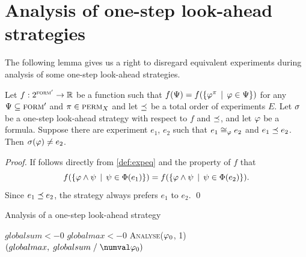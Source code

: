 \section{Analysis of one-step look-ahead strategies}

The following lemma gives us a right to disregard equivalent experiments
  during analysis of some one-step look-ahead strategies.

\begin{lemma}
Let $f: 2^{\textsc{form}'} ->\mathbb{R}$ be a function such that
  $f(\Psi) = f(\{\varphi^\pi \:\:|\:\: \varphi\in\Psi\})$ for any
  $\Psi\subseteq{\textsc{form}'}$ and $\pi\in\textsc{perm}_X$ and
  let $\preceq$ be a total order of experiments $E$.
Let $\sigma$ be a one-step look-ahead strategy with respect to $f$ and $\preceq$, and
let $\varphi$ be a formula.
Suppose there are experiment $e_1$, $e_2$ such that $e_1\cong_{\varphi}e_2$ and $e_1\preceq e_2$.
Then $\sigma(\varphi) \not= e_2$.
\end{lemma}

\begin{proof}
If follows directly from \autoref{def:expeq} and the property of $f$ that
\[f(\{\varphi\wedge\psi\:\:|\:\: \psi\in\Phi(e_1)\}) =
 f(\{\varphi\wedge\psi\:\:|\:\: \psi\in\Phi(e_2)\}).\]
Since $e_1 \preceq e_2$, the strategy always prefers $e_1$ to $e_2$. \qed
\end{proof}

\vspace{-5mm}
\begin{algorithm}[ht]
\caption{Analysis of a one-step look-ahead strategy}
\label{alg:stganalysis}
\DontPrintSemicolon
{}
$globalsum <- 0$\;
$globalmax <- 0$\;
\textsc{Analyse}($\varphi_0$, 1)\;
\Return$ (globalmax,\; globalsum \;/\; \numval\init)$\;\medskip
\setcounter{AlgoLine}{0}
\end{algorithm}

